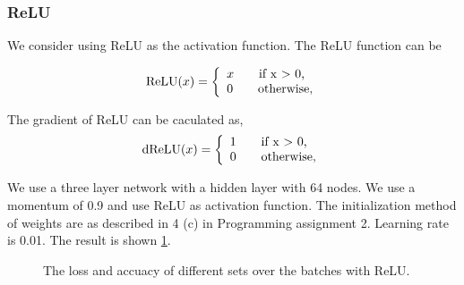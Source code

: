 \documentclass{article} %
\begin{document}
\subsubsection{ReLU}
We consider using ReLU as the activation function. The ReLU function can be 

\[
\textnormal{ReLU}(x) =\left\{
\begin{array}{ll}
x \qquad \textnormal{if x $>$ 0,}\\
0 \qquad \textnormal{otherwise,}
\end{array}
\right.
\]

The gradient of ReLU can be caculated as,
 \[
\textnormal{dReLU}(x) =\left\{
\begin{array}{ll}
1 \qquad \textnormal{if x $>$ 0,}\\
0 \qquad \textnormal{otherwise,}
\end{array}
\right.
\]


We use a three layer network with a hidden layer with 64 nodes. We use a momentum of 0.9 and use ReLU as activation function. The initialization method of weights are as described in 4 (c) in Programming assignment 2. Learning rate is 0.01. The result is shown \ref{Figure: ReLU}.


\begin{figure} [!htbp]
	
	\caption{The loss and accuacy of different sets over the batches with ReLU. }  
	\label{Figure: ReLU}
\end{figure}
\end{document}
